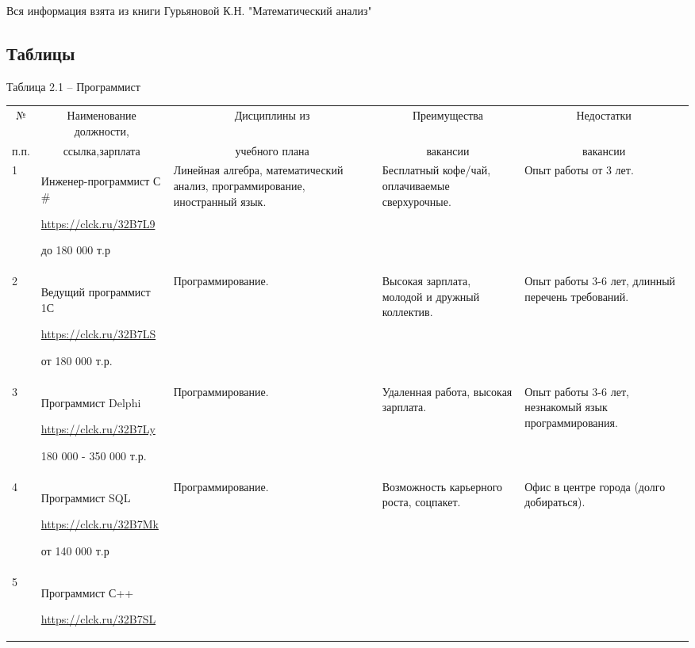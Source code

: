 \indent
Вся информация взята из книги Гурьяновой К.Н. "Математический анализ" \cite{matan}
\newpage
\begin{landscape}
\section{Таблицы}
\vspace{5mm}
Таблица 2.1 – Программист
\begin{table}[H]
	\begin{center}
		\begin{small}
		\begin{tabular}{|p{1.1cm}|p{6cm}|p{5.2cm}|p{4cm}|p{4cm}|} \hline
			\multicolumn{1}{|c|}{№}&\multicolumn{1}{c|}{Наименование должности,}&\multicolumn{1}{c|}{Дисциплины из}&\multicolumn{1}{c|}{Преимущества }&\multicolumn{1}{c|}{Недостатки}\\ 
			\multicolumn{1}{|c|}{п.п.}&\multicolumn{1}{c|}{ссылка,зарплата}&\multicolumn{1}{c|}{учебного плана}&\multicolumn{1}{c|}{ вакансии}&\multicolumn{1}{c|}{вакансии}\\ 
			\hline
			1 & Инженер-программист С$\#$
			
			\url{https://clck.ru/32B7L9}
			
			до 180 000 т.р & Линейная алгебра, математический анализ, программирование, иностранный язык.& Бесплатный кофе/чай, оплачиваемые сверхурочные.& Опыт работы от 3 лет.\\
			\hline
			2 & Ведущий программист 1С
			
			\url{https://clck.ru/32B7LS}
			
			от 180 000 т.р. & Программирование.& Высокая зарплата, молодой и дружный коллектив.& Опыт работы 3-6 лет, длинный перечень требований.\\
			\hline
                3 & Программист Delphi
			
			\url{https://clck.ru/32B7Ly}
			
			180 000 - 350 000 т.р. & Программирование.& Удаленная работа, высокая зарплата.& Опыт работы 3-6 лет, незнакомый язык программирования.\\
			\hline
			4 & Программист SQL
			
			\url{https://clck.ru/32B7Mk}
			
			от 140 000 т.р & Программирование.& Возможность карьерного роста, соцпакет.& Офис в центре города (долго добираться).\\
			\hline
			5 & Программист С++
			
			\url{https://clck.ru/32B7SL}
			

\end{tabular}
\end{small}
\end{center}
\end{table}
\end{landscape}
